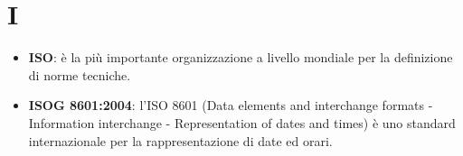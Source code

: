 \section{I}
\begin{itemize} 
	\item
	\textbf{ISO}: è la più importante organizzazione a livello mondiale per la definizione di norme tecniche.
	\item
	\textbf{ISOG 8601:2004}: l'ISO 8601 (Data elements and interchange formats - Information interchange - Representation of dates and times) è uno standard internazionale per la rappresentazione di date ed orari.
\end{itemize}